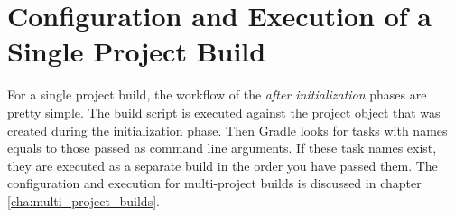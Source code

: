 \section{Configuration and Execution of a Single Project Build} %
\label{sec:configuration_and_execution_of_a_single_project_build}

For a single project build, the workflow of the \emph{after initialization} phases are pretty simple. The build script is executed against the project object that was created during the initialization phase. Then Gradle looks for tasks with names equals to those passed as command line arguments. If these task names exist, they are executed as a separate build in the order you have passed them. The configuration and execution for multi-project builds is discussed in chapter \ref{cha:multi_project_builds}.


